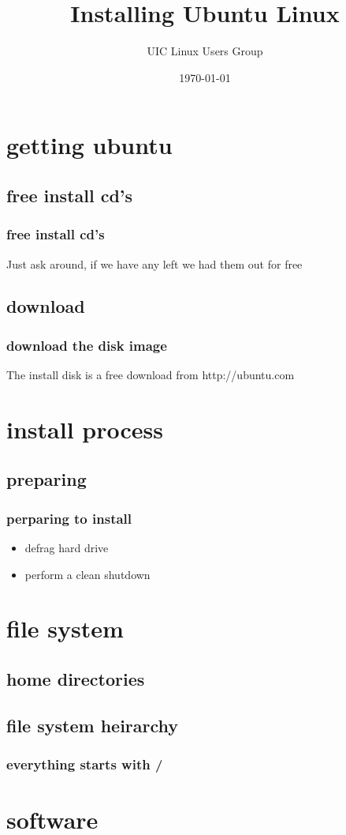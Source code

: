 \documentclass[hyperref={pdfpagelabels=false}]{beamer}
\title{Installing Ubuntu Linux}
\author{UIC Linux Users Group}
\date{\today}
\begin{document}
\frame{\titlepage}
\section[outline]{}
\frame[allowframebreaks]{\tableofcontents}
\section{getting ubuntu}
\subsection{free install cd's}
\frame
{
    \frametitle{free install cd's}
    Just ask around, if we have any left we had them out for free
}
\subsection{download}
\frame
{
    \frametitle{download the disk image}
    The install disk is a free download from http://ubuntu.com
}
\section{install process}
\subsection{preparing}
\frame
{
    \frametitle{perparing to install}
    \begin{itemize}
    \item{defrag hard drive}
    \item{perform a clean shutdown}
    \end{itemize}
}
\section{file system}
\subsection{home directories}
\subsection{file system heirarchy}
\frame
{
    \frametitle{everything starts with /}
    
}
\section{software}
\end{document}
